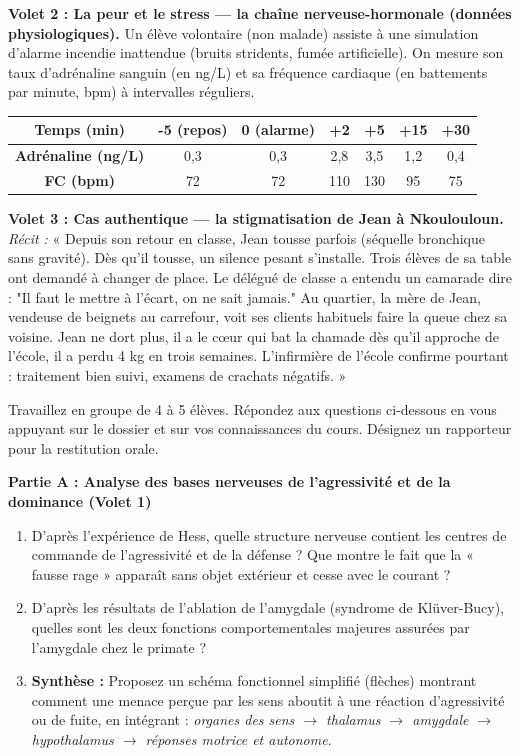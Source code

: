 \documentclass[11pt]{article}
\newcounter{popsec}
\newcounter{popsub}
\newcommand{\courssub}[1]{%
  \stepcounter{popsub}%
  \par\vspace{9pt}\noindent{\popxbold\fontsize{11.5}{13}\selectfont\color{popink}{\color{poporange}\thepopsec.\thepopsub}\hspace{6pt}#1}\par\nopagebreak\vspace{4pt}
}
\begin{document}
\textbf{Volet 2 : La peur et le stress — la chaîne nerveuse-hormonale (données physiologiques).}
Un élève volontaire (non malade) assiste à une simulation d'alarme incendie inattendue (bruits stridents, fumée artificielle). On mesure son taux d'adrénaline sanguin (en ng/L) et sa fréquence cardiaque (en battements par minute, bpm) à intervalles réguliers.

\begin{center}
\begin{tabular}{|c|c|c|c|c|c|c|}\hline
\rowcolor{popblueL}
\textbf{Temps (min)} & \textbf{-5 (repos)} & \textbf{0 (alarme)} & \textbf{+2} & \textbf{+5} & \textbf{+15} & \textbf{+30} \\ \hline
\textbf{Adrénaline (ng/L)} & 0,3 & 0,3 & 2,8 & 3,5 & 1,2 & 0,4 \\ \hline
\textbf{FC (bpm)} & 72 & 72 & 110 & 130 & 95 & 75 \\ \hline
\end{tabular}
\end{center}

\textbf{Volet 3 : Cas authentique — la stigmatisation de Jean à Nkoulouloun.}
\emph{Récit :} « Depuis son retour en classe, Jean tousse parfois (séquelle bronchique sans gravité). Dès qu'il tousse, un silence pesant s'installe. Trois élèves de sa table ont demandé à changer de place. Le délégué de classe a entendu un camarade dire : "Il faut le mettre à l'écart, on ne sait jamais." Au quartier, la mère de Jean, vendeuse de beignets au carrefour, voit ses clients habituels faire la queue chez sa voisine. Jean ne dort plus, il a le cœur qui bat la chamade dès qu'il approche de l'école, il a perdu 4 kg en trois semaines. L'infirmière de l'école confirme pourtant : traitement bien suivi, examens de crachats négatifs. »

\courssub{Consignes}
Travaillez en groupe de 4 à 5 élèves. Répondez aux questions ci-dessous en vous appuyant sur le dossier et sur vos connaissances du cours. Désignez un rapporteur pour la restitution orale.

\textbf{Partie A : Analyse des bases nerveuses de l'agressivité et de la dominance (Volet 1)}
\begin{enumerate}
    \item D'après l'expérience de Hess, quelle structure nerveuse contient les centres de commande de l'agressivité et de la défense ? Que montre le fait que la « fausse rage » apparaît sans objet extérieur et cesse avec le courant ?
    \item D'après les résultats de l'ablation de l'amygdale (syndrome de Klüver-Bucy), quelles sont les deux fonctions comportementales majeures assurées par l'amygdale chez le primate ?
    \item \textbf{Synthèse :} Proposez un schéma fonctionnel simplifié (flèches) montrant comment une menace perçue par les sens aboutit à une réaction d'agressivité ou de fuite, en intégrant : \emph{organes des sens $\rightarrow$ thalamus $\rightarrow$ amygdale $\rightarrow$ hypothalamus $\rightarrow$ réponses motrice et autonome}.
\end{enumerate}
\end{document}
